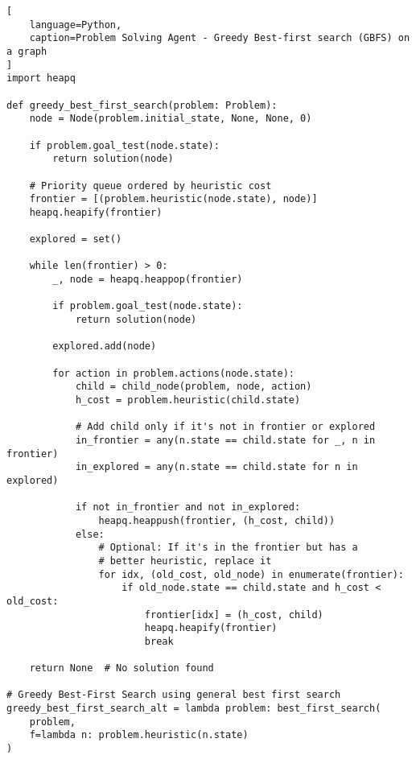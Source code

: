\begin{lstlisting}[
    language=Python,
    caption=Problem Solving Agent - Greedy Best-first search (GBFS) on a graph
]
import heapq

def greedy_best_first_search(problem: Problem):
    node = Node(problem.initial_state, None, None, 0)

    if problem.goal_test(node.state):
        return solution(node)

    # Priority queue ordered by heuristic cost
    frontier = [(problem.heuristic(node.state), node)]
    heapq.heapify(frontier)

    explored = set()

    while len(frontier) > 0:
        _, node = heapq.heappop(frontier)

        if problem.goal_test(node.state):
            return solution(node)

        explored.add(node)

        for action in problem.actions(node.state):
            child = child_node(problem, node, action)
            h_cost = problem.heuristic(child.state)

            # Add child only if it's not in frontier or explored
            in_frontier = any(n.state == child.state for _, n in frontier)
            in_explored = any(n.state == child.state for n in explored)

            if not in_frontier and not in_explored:
                heapq.heappush(frontier, (h_cost, child))
            else:
                # Optional: If it's in the frontier but has a
                # better heuristic, replace it
                for idx, (old_cost, old_node) in enumerate(frontier):
                    if old_node.state == child.state and h_cost < old_cost:
                        frontier[idx] = (h_cost, child)
                        heapq.heapify(frontier)
                        break

    return None  # No solution found

# Greedy Best-First Search using general best first search
greedy_best_first_search_alt = lambda problem: best_first_search(
    problem,
    f=lambda n: problem.heuristic(n.state)
)
\end{lstlisting}










